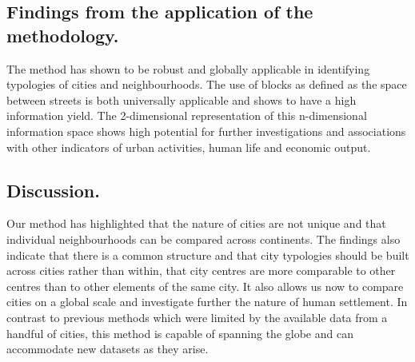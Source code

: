 \documentclass{nature}
\begin{document}
\subsection{Findings from the application of the methodology.}
The method has shown to be robust and globally applicable in identifying typologies of cities and neighbourhoods. The use of blocks as defined as the space between streets is both universally applicable and shows to have a high information yield. The 2-dimensional representation of this n-dimensional information space shows high potential for further investigations and associations with other indicators of urban activities, human life and economic output.

\subsection{Discussion.}
Our method has highlighted that the nature of cities are not unique and that individual neighbourhoods can be compared across continents. The findings also indicate that there is a common structure and that city typologies should be built across cities rather than within, that city centres are more comparable to other centres than to other elements of the same city. It also allows us now to compare cities on a global scale and investigate further the nature of human settlement. In contrast to previous methods which were limited by the available data from a handful of cities, this method is capable of spanning the globe and can accommodate new datasets as they arise.  
\end{document}
